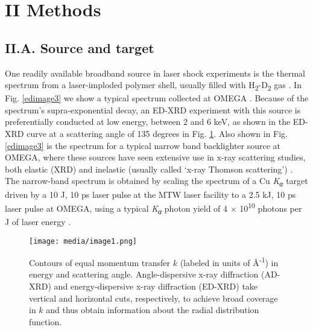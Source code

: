 \section{II Methods}\label{ii-methods}

\subsection{II.A. Source and target}

One readily available broadband source in laser shock experiments is the
thermal spectrum from a laser-imploded polymer shell, usually filled
with H\textsubscript{2}-D\textsubscript{2} gas
 \cite{MADDOX2011ABSOLUTE, yaakobi2003extended}.
In Fig. \ref{edimage3} we show a typical spectrum collected at OMEGA
.
Because of the spectrum's supra-exponential decay, an ED-XRD experiment
with this source is preferentially conducted at low energy, between 2
and 6 keV, as shown in the ED-XRD curve at a scattering angle of 135
degrees in Fig. \ref{fig:ed1}. Also shown in Fig. \ref{edimage3} is the spectrum for a typical
narrow band backlighter source at OMEGA, where these sources have seen
extensive use in x-ray scattering studies, both elastic (XRD)
 \cite{ma2013x}
and inelastic (usually called `x-ray Thomson scattering')
 \cite{glenzer2009x}.
The narrow-band spectrum is obtained by scaling the spectrum of a Cu
\emph{K\textsubscript{α}} target driven by a 10 J, 10 ps laser pulse at
the MTW laser facility to a 2.5 kJ, 10 ps laser pulse at OMEGA, using a
typical \emph{K\textsubscript{α}} photon yield of 4 ×
10\textsuperscript{10} photons per J of laser energy
 \cite{AKLI2007TEMPERATURE}.

\begin{figure}[h]
\caption{
Contours of equal momentum transfer \(k\) (labeled in units of
Å\textsuperscript{-1}) in energy and scattering angle. Angle-dispersive
x-ray diffraction (AD-XRD) and energy-dispersive x-ray diffraction
(ED-XRD) take vertical and horizontal cuts, respectively, to achieve
broad coverage in \(k\) and thus obtain information about the radial
distribution function.
}
\label{fig:ed1}
\centering
\texttt{[image: media/image1.png]}
\end{figure}


